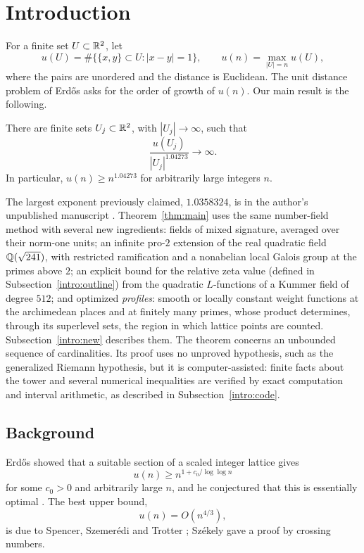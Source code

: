 \section{Introduction}\label{intro:section}
For a finite set $U\subset\mathbb R^2$, let
\[
 u(U)=\#\{\{x,y\}\subset U:|x-y|=1\},\qquad
 u(n)=\max_{|U|=n}u(U),
\]
where the pairs are unordered and the distance is Euclidean. The unit
distance problem of Erd\H{o}s \cite{Erdos1946} asks for the order of
growth of $u(n)$. Our main result is the following.

\begin{theorem}\label{thm:main}
There are finite sets $U_j\subset\mathbb R^2$, with $|U_j|\to\infty$, such that
\[
 \frac{u(U_j)}{|U_j|^{1.04273}}\longrightarrow\infty.
\]
In particular, $u(n)\ge n^{1.04273}$ for arbitrarily large integers $n$.
\end{theorem}

The largest exponent previously claimed, $1.0358324$, is in the author's
unpublished manuscript \cite{Naslund0358}. Theorem~\ref{thm:main} uses
the same number-field method with several new ingredients: fields of
mixed signature, averaged over their norm-one units; an infinite
pro-$2$ extension of the real quadratic field $\mathbb Q(\sqrt{241})$, with
restricted ramification and a nonabelian local Galois group at the
primes above $2$; an explicit
bound for the relative zeta value (defined in
Subsection~\ref{intro:outline}) from the quadratic $L$-functions of a
Kummer field of degree $512$; and optimized \emph{profiles}: smooth or
locally constant weight functions at the archimedean places and at
finitely many primes, whose product determines, through its superlevel
sets, the region in which lattice points are counted. Subsection~\ref{intro:new} describes
them. The theorem concerns an unbounded sequence of cardinalities. Its
proof uses no unproved hypothesis, such as the generalized Riemann
hypothesis, but it is computer-assisted: finite facts about the tower
and several numerical inequalities are verified by exact computation and
interval arithmetic, as described in Subsection~\ref{intro:code}.

\subsection{Background}\label{intro:background}
Erd\H{o}s \cite{Erdos1946} showed that a suitable section of a scaled
integer lattice gives
\[
 u(n)\ge n^{1+c_0/\log\log n}
\]
for some $c_0>0$ and arbitrarily large $n$, and he conjectured that this is
essentially optimal \cite{Erdos1946,Erdos1994}. The best upper bound,
\[
 u(n)=O(n^{4/3}),
\]
is due to Spencer, Szemer\'edi and Trotter
\cite{SpencerSzemerediTrotter1984}; Sz\'ekely \cite{Szekely1997} gave a
proof by crossing numbers.

